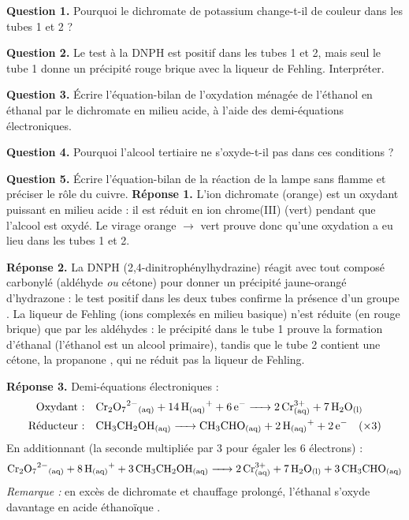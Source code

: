 \documentclass[11pt]{article}
\newcommand{\cle}[1]{{\popxbold\color{popdark}#1}}
\begin{document}
\begin{exoresolu}
\textbf{Question 1.} Pourquoi le dichromate de potassium change-t-il de couleur dans les tubes 1 et 2 ?\par
\textbf{Question 2.} Le test à la DNPH est positif dans les tubes 1 et 2, mais seul le tube 1 donne un précipité rouge brique avec la liqueur de Fehling. Interpréter.\par
\textbf{Question 3.} Écrire l'équation-bilan de l'oxydation ménagée de l'éthanol en éthanal par le dichromate en milieu acide, à l'aide des demi-équations électroniques.\par
\textbf{Question 4.} Pourquoi l'alcool tertiaire ne s'oxyde-t-il pas dans ces conditions ?\par
\textbf{Question 5.} Écrire l'équation-bilan de la réaction de la lampe sans flamme et préciser le rôle du cuivre.
\tcblower
\textbf{Réponse 1.} L'ion dichromate  (orange) est un oxydant puissant en milieu acide : il est réduit en ion chrome(III)  (vert) pendant que l'alcool est oxydé. Le virage orange $\rightarrow$ vert prouve donc qu'une oxydation a eu lieu dans les tubes 1 et 2.

\textbf{Réponse 2.} La DNPH (2,4-dinitrophénylhydrazine) réagit avec tout composé carbonylé (aldéhyde \emph{ou} cétone) pour donner un précipité jaune-orangé d'hydrazone : le test positif dans les deux tubes confirme la présence d'un groupe . La liqueur de Fehling (ions  complexés en milieu basique) n'est réduite (en  rouge brique) que par les aldéhydes : le précipité dans le tube 1 prouve la formation d'\cle{éthanal}  (l'éthanol est un alcool primaire), tandis que le tube 2 contient une \cle{cétone}, la propanone , qui ne réduit pas la liqueur de Fehling.

\textbf{Réponse 3.} Demi-équations électroniques :
\begin{align*}
\text{Oxydant :}\quad & \ce{Cr2O7^2-_{(aq)} + 14 H+_{(aq)} + 6 e- -> 2 Cr^3+_{(aq)} + 7 H2O_{(l)}} \\
\text{Réducteur :}\quad & \ce{CH3CH2OH_{(aq)} -> CH3CHO_{(aq)} + 2 H+_{(aq)} + 2 e-} \quad (\times 3)
\end{align*}
En additionnant (la seconde multipliée par 3 pour égaler les 6 électrons) :
\[ \ce{Cr2O7^2-_{(aq)} + 8 H+_{(aq)} + 3 CH3CH2OH_{(aq)} -> 2 Cr^3+_{(aq)} + 7 H2O_{(l)} + 3 CH3CHO_{(aq)}} \]
\vspace{2pt}
\textit{Remarque :} en excès de dichromate et chauffage prolongé, l'éthanal s'oxyde davantage en acide éthanoïque .


\end{exoresolu}
\end{document}
